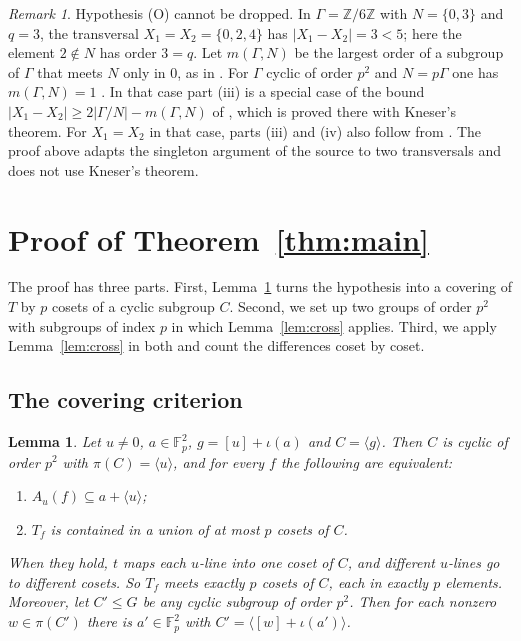 \documentclass[11pt]{amsart}
\newtheorem{lemma}[theorem]{Lemma}
\theoremstyle{definition}\newtheorem{definition}[theorem]{Definition}
\theoremstyle{remark}\newtheorem{remark}[theorem]{Remark}
\newcommand{\F}{\mathbb{F}}
\newcommand{\Z}{\mathbb{Z}}
\newcommand{\abs}[1]{\lvert #1\rvert}
\newcommand{\gen}[1]{\langle #1\rangle}
\begin{document}
\begin{remark}\label{rem:cross}
Hypothesis (O) cannot be dropped.
In \(\Gamma=\Z/6\Z\) with \(N=\{0,3\}\) and \(q=3\), the transversal \(X_1=X_2=\{0,2,4\}\) has \(\abs{X_1-X_2}=3<5\); here the element \(2\notin N\) has order \(3=q\).
Let \(m(\Gamma,N)\) be the largest order of a subgroup of \(\Gamma\) that meets \(N\) only in \(0\), as in \cite{BPT}.
For \(\Gamma\) cyclic of order \(p^2\) and \(N=p\Gamma\) one has \(m(\Gamma,N)=1\) \cite[Proposition~5.3]{BPT}.
In that case part (iii) is a special case of the bound \(\abs{X_1-X_2}\ge2\abs{\Gamma/N}-m(\Gamma,N)\) of \cite[Theorem~4.2]{BPT}, which is proved there with Kneser's theorem.
For \(X_1=X_2\) in that case, parts (iii) and (iv) also follow from \cite[Propositions~3.2 and~3.3]{BPT}.
The proof above adapts the singleton argument of the source to two transversals and does not use Kneser's theorem.
\end{remark}

\section{\texorpdfstring{Proof of Theorem~\ref{thm:main}}{Proof of the main theorem}}\label{sec:proof}

The proof has three parts.
First, Lemma~\ref{lem:cover} turns the hypothesis into a covering of \(T\) by \(p\) cosets of a cyclic subgroup \(C\).
Second, we set up two groups of order \(p^2\) with subgroups of index \(p\) in which Lemma~\ref{lem:cross} applies.
Third, we apply Lemma~\ref{lem:cross} in both and count the differences coset by coset.

\subsection{The covering criterion}

\begin{lemma}\label{lem:cover}
Let \(u\ne0\), \(a\in\F_p^2\), \(g=[u]+\iota(a)\) and \(C=\gen{g}\).
Then \(C\) is cyclic of order \(p^2\) with \(\pi(C)=\gen{u}\), and for every \(f\) the following are equivalent:
\begin{enumerate}
\item[(1)] \(A_u(f)\subseteq a+\gen{u}\);
\item[(2)] \(T_f\) is contained in a union of at most \(p\) cosets of \(C\).
\end{enumerate}
When they hold, \(t\) maps each \(u\)-line into one coset of \(C\), and different \(u\)-lines go to different cosets.
So \(T_f\) meets exactly \(p\) cosets of \(C\), each in exactly \(p\) elements.
Moreover, let \(C'\le G\) be any cyclic subgroup of order \(p^2\).
Then for each nonzero \(w\in\pi(C')\) there is \(a'\in\F_p^2\) with \(C'=\gen{[w]+\iota(a')}\).
\end{lemma}
\end{document}
